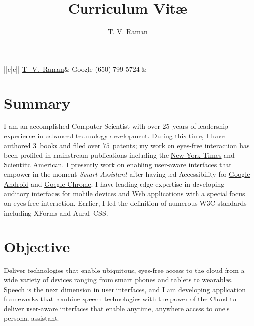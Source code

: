\documentclass{article}
\title{Curriculum Vit\ae}
\author{T. V. Raman}
\begin{document}
\begin{center}
\begin{tabular}{||c|c||}\hline
{\href{https://en.wikipedia.org/wiki/T._V._Raman}{T.\  V.\  Raman}}&
  {Google}\newrow
  \newrow
\phone(650) 799-5724 &
\href{mailto:tv.raman.tv@gmail.com}{}  \newrow
\end{tabular}
\end{center}

\section*{Summary}

I am an accomplished Computer Scientist with over $25$~years of
leadership experience in {advanced technology development}. During
this time, I have authored $3$~books and filed over $75$~patents; my
work on \href{http://www.youtube.com/watch?v=QPTcNj-3kI8}{eyes-free
  interaction} has been profiled in mainstream publications including
the
\href{http://www.nytimes.com/2009/01/04/business/04blind.html?_r=1}{New
  York Times} and
\href{http://emacspeak.sourceforge.net/raman/sciam-0996profile.html}{Scientific
  American}. I presently work on enabling user-aware interfaces that
empower in-the-moment \emph{Smart Assistant} after having led
Accessibility for \href{http://eyes-free.blogspot.com}{Google Android}
and \href{http://chromevox.blogspot.com}{Google Chrome}. I have
leading-edge expertise in developing auditory interfaces for mobile
devices and Web applications with a special focus on eyes-free
interaction. Earlier, I led the definition of numerous W3C standards
including XForms and Aural~CSS.

\section*{Objective} 

Deliver technologies that enable ubiquitous, eyes-free access to
 the cloud  from a wide variety of devices ranging
from smart phones and tablets to wearables. Speech is the next
dimension in user interfaces, and I am developing application
frameworks that combine speech technologies with the power of the
 Cloud to deliver user-aware interfaces that enable anytime,
anywhere access to one's  personal  assistant.
\end{document}
